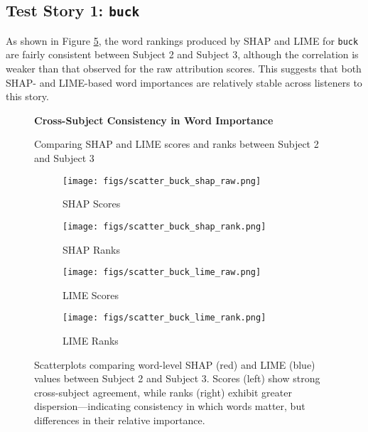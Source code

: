 \documentclass[10pt,letterpaper]{article}
\begin{document}
\subsection{Test Story 1: \texttt{buck}}

As shown in Figure \ref{fig:scatter_buck_1}, the word rankings produced by SHAP and LIME for \texttt{buck} are fairly consistent between Subject 2 and Subject 3, although the correlation is weaker than that observed for the raw attribution scores. This suggests that both SHAP- and LIME-based word importances are relatively stable across listeners to this story.


\begin{figure}[ht]
    \centering

    \parbox{\textwidth}{\centering 
        \fontsize{13pt}{13pt}\selectfont \textbf{Cross-Subject Consistency in Word Importance}  
        
        {\fontsize{11pt}{13pt}\selectfont Comparing SHAP and LIME scores and ranks between Subject 2 and Subject 3} 
    }
    
    \begin{subfigure}[t]{0.22\textwidth}
        \centering
        \caption{SHAP Scores}
        \texttt{[image: figs/scatter\_buck\_shap\_raw.png]}
        \label{subfig:scatter_buck_shap_raw}
    \end{subfigure}
    \hfill
    \begin{subfigure}[t]{0.22\textwidth}
        \centering
        \caption{SHAP Ranks}
        \texttt{[image: figs/scatter\_buck\_shap\_rank.png]}
        \label{subfig:scatter_buck_shap_rank}
    \end{subfigure}
    \hfill
    \begin{subfigure}[t]{0.22\textwidth}
        \centering
        \caption{LIME Scores}
        \texttt{[image: figs/scatter\_buck\_lime\_raw.png]}
        \label{subfig:scatter_buck_lime_raw}
    \end{subfigure}
    \hfill
    \begin{subfigure}[t]{0.22\textwidth}
        \centering
        \caption{LIME Ranks}
        \texttt{[image: figs/scatter\_buck\_lime\_rank.png]}
        \label{subfig:scatter_buck_lime_rank}
    \end{subfigure}
    \caption{Scatterplots comparing word-level SHAP (red) and LIME (blue) values between Subject 2 and Subject 3. Scores (left) show strong cross-subject agreement, while ranks (right) exhibit greater dispersion—indicating consistency in which words matter, but differences in their relative importance.}
    \label{fig:scatter_buck_1}
\end{figure}
\end{document}
